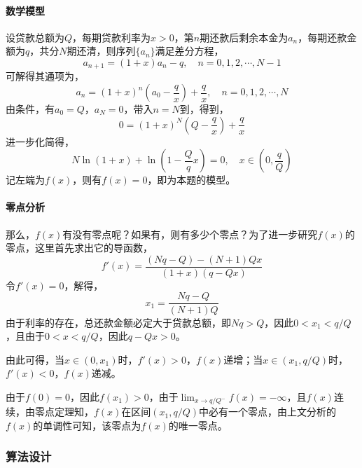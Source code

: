 \documentclass[12pt,a4paper]{article}
\begin{document}
\paragraph{数学模型} 设贷款总额为$Q$，每期贷款利率为$x>0$，第$n$期还款后剩余本金为$a_n$，每期还款金额为$q$，共分$N$期还清，则序列$\{a_n\}$满足差分方程，
\begin{equation}
    a_{n+1} = (1+x)a_{n} - q, \quad n = 0,1,2,\cdots,N-1
\end{equation}
可解得其通项为，
\begin{equation}\label{eq:ex3_difference}
    a_{n} = (1+x)^n \left(a_0 - \frac{q}{x}\right) + \frac{q}{x}, \quad n = 0,1,2,\cdots,N
\end{equation}
由条件，有$a_0 = Q$，$a_N=0$，带入$n=N$到，得到，
\begin{equation}
    0 = (1+x)^N \left(Q - \frac{q}{x}\right) + \frac{q}{x}
\end{equation}
进一步化简得，
\begin{equation}\label{eq:ex3_model}
    N \ln (1+x) + \ln \left(1-\frac{Q}{q} x\right) = 0, \quad x \in \left(0, \frac{q}{Q}\right)
\end{equation}
记左端为$f(x)$，则有$f(x)=0$，即为本题的模型。

\paragraph{零点分析} 那么，$f(x)$有没有零点呢？如果有，则有多少个零点？为了进一步研究$f(x)$的零点，这里首先求出它的导函数，
\begin{equation}
    f'(x) = \frac{(Nq - Q) - (N+1)Qx}{(1+x)(q-Qx)}
\end{equation}
令$f'(x) = 0$，解得，
\begin{equation}
    x_1 = \frac{Nq - Q}{(N+1)Q}
\end{equation}
由于利率的存在，总还款金额必定大于贷款总额，即$Nq > Q$，因此$0 < x_1 < q/Q$，且由于$0 < x < q/Q$，因此$q-Qx>0$。

由此可得，当$x \in (0, x_1)$时，$f'(x)>0$，$f(x)$递增；当$x\in (x_1, q/Q)$时，$f'(x)<0$，$f(x)$递减。

由于$f(0) = 0$，因此$f(x_1) > 0$，由于$\lim_{x\rightarrow q/Q^-} f(x)= -\infty$，且$f(x)$连续，由零点定理知，$f(x)$在区间$(x_1, q/Q)$中必有一个零点，由上文分析的$f(x)$的单调性可知，该零点为$f(x)$的唯一零点。

\subsubsection{算法设计}
\end{document}
